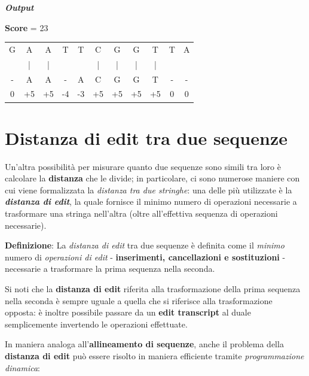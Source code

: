    \noindent \textbf{\textit{Output}}
    
\centering 
    \textbf{Score} = 23
    \vspace{20pt}
    \begin{table}[h]
        \centering
        \begin{tabular}{ccccccccccc}
             G & A & A & T & T & C & G & G & T & T & A \\
               & | & | &   &   & | & | & | & | &   &  \\
             - & A & A & - & A & C & G & G & T & - & - \\
             \hline
             0 & +5 & +5 & -4 & -3 & +5 & +5 & +5 & +5 & 0 & 0 \\
             \hline
        \end{tabular}
    \end{table}
    \vspace{20pt}

\raggedright
\section{Distanza di edit tra due sequenze}
\label{section:edit-distance}
    Un'altra possibilità per misurare quanto due sequenze sono simili tra loro è calcolare la \textbf{distanza} che le divide; in particolare, ci sono numerose maniere con cui viene formalizzata la \emph{distanza tra due stringhe}: una delle più utilizzate è la \textbf{\textit{distanza di edit}}, la quale fornisce il minimo numero di operazioni necessarie a trasformare una stringa nell'altra (oltre all'effettiva sequenza di operazioni necessarie).
    \vspace{20pt}
    
    \textbf{Definizione}: La \emph{distanza di edit} tra due sequenze è definita come il \emph{minimo} numero di \emph{operazioni di edit} - \textbf{inserimenti, cancellazioni e sostituzioni} - necessarie a trasformare la prima sequenza nella seconda. \cite{Gusfield}
    \vspace{20pt}
    
    Si noti che la \textbf{distanza di edit} riferita alla trasformazione della prima sequenza nella seconda è sempre uguale a quella che si riferisce alla trasformazione opposta: è inoltre possibile passare da un \textbf{edit transcript} al duale semplicemente invertendo le operazioni effettuate.

    In maniera analoga all'\textbf{allineamento di sequenze}, anche il problema della \textbf{distanza di edit} può essere risolto in maniera efficiente tramite \emph{programmazione dinamica}:
    \vspace{20pt}
    
